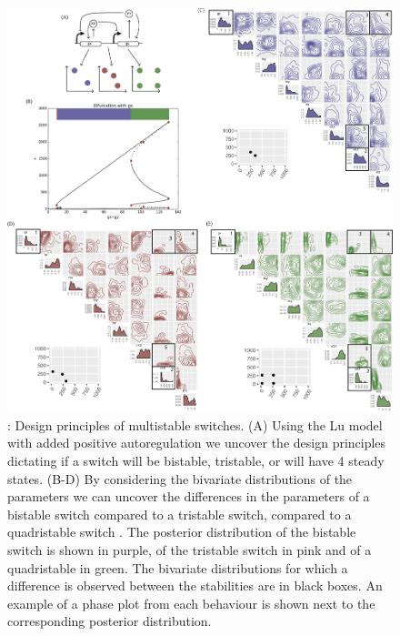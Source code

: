 \begin{figure}[htbp]
	\centerfloat
		\includegraphics[width=1.2\textwidth]{../../chapters/chapterStabilityFinder/images/Lu_234.png}
		\caption[ Design principles of multistable switches]{ \label{fig:lu_234}: Design principles of multistable switches. (A) Using the Lu model with added positive autoregulation we uncover the design principles dictating if a switch will be bistable, tristable, or will have 4 steady states. (B-D) By considering the bivariate distributions of the parameters we can uncover the differences in the parameters of a bistable switch compared to a tristable switch, compared to a quadristable switch . The posterior distribution of the bistable switch is shown in purple, of the tristable switch in pink and of a quadristable in green. The bivariate distributions for which a difference is observed between the stabilities are in black boxes. An example of a phase plot from each behaviour is shown next to the corresponding posterior distribution.}
\end{figure}



